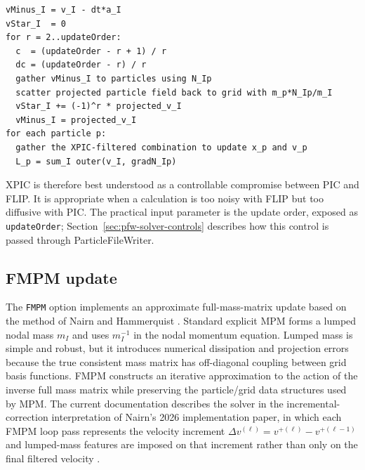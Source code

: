 \begin{lstlisting}[caption={XPIC update structure.},basicstyle=\ttfamily\small]
vMinus_I = v_I - dt*a_I
vStar_I  = 0
for r = 2..updateOrder:
  c  = (updateOrder - r + 1) / r
  dc = (updateOrder - r) / r
  gather vMinus_I to particles using N_Ip
  scatter projected particle field back to grid with m_p*N_Ip/m_I
  vStar_I += (-1)^r * projected_v_I
  vMinus_I = projected_v_I
for each particle p:
  gather the XPIC-filtered combination to update x_p and v_p
  L_p = sum_I outer(v_I, gradN_Ip)
\end{lstlisting}

XPIC is therefore best understood as a controllable compromise between PIC and FLIP.  It is appropriate when a calculation is too noisy with FLIP but too diffusive with PIC.  The practical input parameter is the update order, exposed as \texttt{updateOrder}; Section~\ref{sec:pfw-solver-controls} describes how this control is passed through ParticleFileWriter.

\subsection{FMPM update}
\label{subsec:fmpm-update}

The \texttt{FMPM} option implements an approximate full-mass-matrix update based on the method of Nairn and Hammerquist \cite{nairn2021fmpm}.  Standard explicit MPM forms a lumped nodal mass $m_I$ and uses $m_I^{-1}$ in the nodal momentum equation.  Lumped mass is simple and robust, but it introduces numerical dissipation and projection errors because the true consistent mass matrix has off-diagonal coupling between grid basis functions.  FMPM constructs an iterative approximation to the action of the inverse full mass matrix while preserving the particle/grid data structures used by MPM.  The current documentation describes the solver in the incremental-correction interpretation of Nairn's 2026 implementation paper, in which each FMPM loop pass represents the velocity increment $\Delta v^{(\ell)}=v^{+(\ell)}-v^{+(\ell-1)}$ and lumped-mass features are imposed on that increment rather than only on the final filtered velocity \cite{nairn2026fmpm}.

